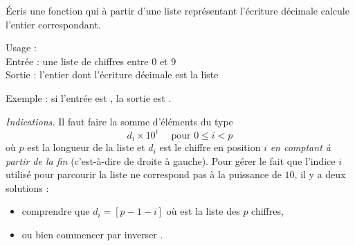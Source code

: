 \documentclass[11pt,class=report,crop=false]{standalone}
\begin{document}
\begin{activite}


\'Ecris une fonction  qui à partir d'une liste représentant l'écriture décimale calcule l'entier correspondant.
  
  \begin{fonction}
  Usage :  \\
  Entrée : une liste de chiffres entre $0$ et $9$ \\
  Sortie : l'entier dont l'écriture décimale est la liste
  
  \medskip
  Exemple : si l'entrée est \ci{[1,2,3,4]}, la sortie est .
  \end{fonction} 
  
  \emph{Indications.}  Il faut faire la somme d'éléments du type
    $$d_i \times 10^{i} \quad \text{ pour } 0 \le i < p$$
    où $p$ est la longueur de la liste et $d_i$ est le chiffre en position $i$ \emph{en comptant à partir de la fin} (c'est-à-dire de droite à gauche). Pour gérer le fait que l'indice $i$ utilisé pour parcourir la liste ne correspond pas à la puissance de $10$, il y a deux solutions :
  \begin{itemize}
    \item comprendre que $d_i = $$[p-1-i]$ où  est la liste des $p$ chiffres,
    \item ou bien commencer par inverser .    
   \end{itemize}  
  
\end{activite}

\end{document}
